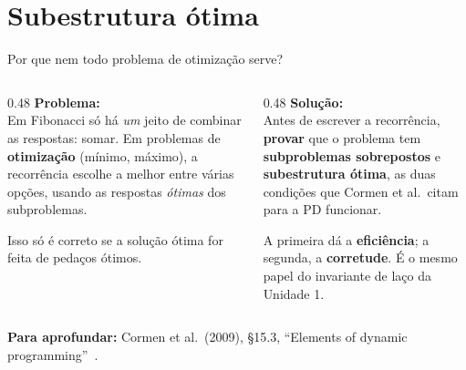 \documentclass[aspectratio=169,xcolor=table]{beamer}
\newcommand{\fonte}[1]{%
  \vfill
  {\tiny\color{gray!55!black}\textbf{Para aprofundar:} #1\par}%
}
\begin{document}
\section{Subestrutura ótima}

\begin{frame}{Por que nem todo problema de otimização serve?}
  \begin{columns}[T]
    \begin{column}{0.48\textwidth}
      \textbf{Problema:}\\[2pt]
      \scriptsize Em Fibonacci só há \emph{um} jeito de combinar as respostas: somar.
      Em problemas de \textbf{otimização} (mínimo, máximo), a recorrência escolhe a
      melhor entre várias opções, usando as respostas \emph{ótimas} dos subproblemas.
      \medskip

      Isso só é correto se a solução ótima for feita de pedaços ótimos.
    \end{column}
    \begin{column}{0.48\textwidth}
      \textbf{Solução:}\\[2pt]
      \scriptsize Antes de escrever a recorrência, \textbf{provar} que o problema tem
      \textbf{subproblemas sobrepostos} e \textbf{subestrutura ótima}, as duas
      condições que Cormen et al.\ citam para a PD funcionar.
      \medskip

      A primeira dá a \textbf{eficiência}; a segunda, a \textbf{corretude}.
      É o mesmo papel do invariante de laço da Unidade 1.
    \end{column}
  \end{columns}
  \fonte{Cormen et al.\ (2009), \S 15.3, ``Elements of dynamic programming''~\cite{cormen2009introduction}.}
\end{frame}
\end{document}
